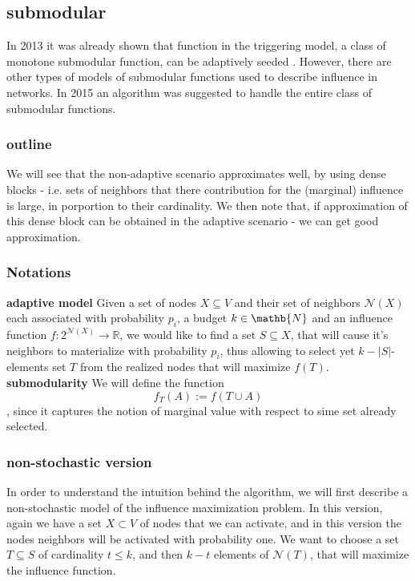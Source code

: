 \subsection{submodular}\label{sec:sub}
In 2013 it was already shown that function in the triggering model, a class of monotone submodular function, can be adaptively seeded \cite{seeman2013adaptive}. However, there are other types of models of submodular functions used to describe influence in networks. In 2015 \cite{badanidiyuru2016locally} an algorithm was suggested to handle the entire class of submodular functions.

\subsubsection{outline}
We will see that the non-adaptive scenario approximates well, by using dense blocks - i.e. sets of neighbors that there contribution for the (marginal) influence is large, in porportion to their cardinality. We then note that, if approximation of this dense block can be obtained in the adaptive scenario - we can get good approximation. 	

\subsubsection{Notations}
\textbf{adaptive model} Given a set of nodes $X\subseteq V$ and their set of neighbors $\mathcal{N}(X)$ each associated with probability $p_i$, a budget $k\in\mathb{N}$ and an influence function $f:2^{\mathcal{N}(X)}\rightarrow \mathbb{R}$, we would like to find a set $S\subseteq X$, that will cause it's neighbors to materialize with probability $p_i$, thus allowing to select yet $k-|S|$-elements set $T$ from the realized nodes that will maximize $f(T)$.
\textbf{submodularity}
We will define the function $$f_T(A):=f(T\cup A)$$, since it captures the notion of marginal value with respect to sime set already selected.
 
\subsubsection{non-stochastic version}
In order to understand the intuition behind the algorithm, we will first describe a non-stochastic model of the influence maximization problem. In this version, again we have a set $X\subset V$ of nodes that we can activate, and in this version the nodes neighbors will be activated with probability one. We want to choose a set $T\subseteq S$ of cardinality $t\le k$, and then $k-t$ elements of $\mathcal{N}(T)$, that will maximize the influence function. 

